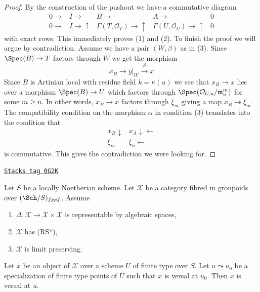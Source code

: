 \begin{proof}
\medskip\noindent
By the construction of the pushout we have a commutative diagram
$$
\begin{array}{ccccc}0 \longrightarrow & I \longrightarrow & B \longrightarrow & A \longrightarrow & 0 \\ 0 \longrightarrow & I \longrightarrow\uparrow & \Gamma(T, \mathcal{O}_T) \longrightarrow\uparrow & \Gamma(U, \mathcal{O}_U) \longrightarrow\uparrow & 0\end{array}
$$
with exact rows. This immediately proves (1) and (2).
To finish the proof we will argue by contradiction.
Assume we have a pair $(W, \beta)$ as in (3).
Since $\Spec(B) \to T$ factors through $W$ we get the morphism
$$
x_B \to y|_W \xrightarrow{\beta} x
$$
Since $B$ is Artinian local with residue field $k = \kappa(u)$
we see that $x_B \to x$ lies over a morphism $\Spec(B) \to U$
which factors through $\Spec(\mathcal{O}_{U, u}/\mathfrak m_u^m)$
for some $m \geq n$. In other words, $x_B \to x$ factors
through $\xi_m$ giving a map $x_B \to \xi_m$.
The compatibility condition on the morphism $\alpha$
in condition (3) translates into the condition that
$$
\begin{array}{cc}x_B \downarrow & x_A \downarrow\longleftarrow \\ \xi_m & \xi_n \longleftarrow\end{array}
$$
is commutative. This gives the contradiction we were looking for.
\end{proof}

\begin{lemma}
\label{artin-lemma-generalization-versality}
\href{https://stacks.math.columbia.edu/tag/0G2K}{\texttt{Stacks tag 0G2K}}

Let $S$ be a locally Noetherian scheme. Let $\mathcal{X}$ be a category fibred
in groupoids over $(\Sch/S)_{fppf}$. Assume
\begin{enumerate}
\item $\Delta : \mathcal{X} \to \mathcal{X} \times \mathcal{X}$ is
representable by algebraic spaces,
\item $\mathcal{X}$ has (RS*),
\item $\mathcal{X}$ is limit preserving.
\end{enumerate}
Let $x$ be an object of $\mathcal{X}$ over a scheme $U$ of finite type over
$S$. Let $u \leadsto u_0$ be a specialization of finite type points of $U$
such that $x$ is versal at $u_0$. Then $x$ is versal at $u$.
\end{lemma}

